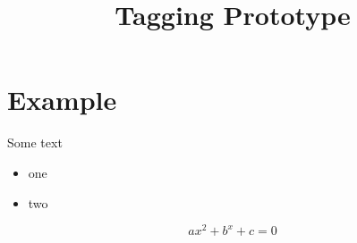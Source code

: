 \documentclass{article}
\title{Tagging Prototype}
\begin{document}
\section{Example}
Some text
\begin{itemize}
\item one
\item two
\end{itemize}
\[
ax^2+b^x+c=0
\]
\end{document}
